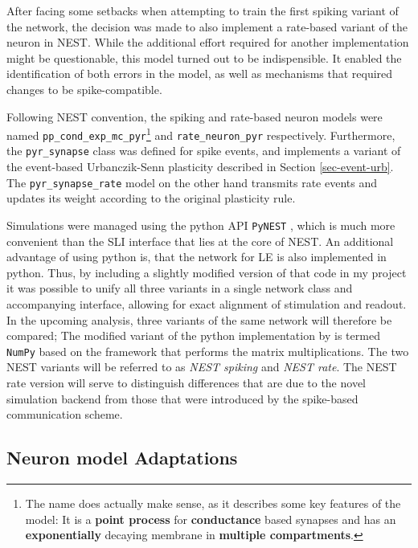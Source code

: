 After facing some setbacks when attempting to train the first spiking variant of the network, the decision was made to
also implement a rate-based variant of the neuron in NEST.  While the additional effort required for another
implementation might be questionable, this model turned out to be indispensible. It enabled the identification of both
errors in the model, as well as mechanisms that required changes to be spike-compatible. 

Following NEST convention, the spiking and rate-based neuron models were named
\texttt{pp\_cond\_exp\_mc\_pyr}\footnote{The name does actually make sense, as it describes some key features of the
model: It is a \textbf{point process} for \textbf{conductance} based synapses and has an \textbf{exponentially} decaying
membrane in \textbf{multiple compartments}.} and \texttt{rate\_neuron\_pyr} respectively. Furthermore, the
\texttt{pyr\_synapse} class was defined for spike events, and implements a variant of the event-based Urbanczik-Senn
plasticity described in Section \ref{sec-event-urb}. The \texttt{pyr\_synapse\_rate} model on the other hand transmits
rate events and updates its weight according to the original plasticity rule.

Simulations were managed using the python API \texttt{PyNEST} \citep{Eppler2009}, which is much more convenient than the
SLI interface that lies at the core of NEST. An additional advantage of using python is, that the network for LE is also
implemented in python. Thus, by including a slightly modified version of that code in my project it was possible to
unify all three variants in a single network class and accompanying interface, allowing for exact alignment of
stimulation and readout. In the upcoming analysis, three variants of the same network will therefore be compared; The
modified variant of the python implementation by \cite{Haider2021} is termed \texttt{NumPy} based on the framework that
performs the matrix multiplications. The two NEST variants will be referred to as \textit{NEST spiking} and \textit{NEST
rate}. The NEST rate version will serve to distinguish differences that are due to the novel simulation backend from
those that were introduced by the spike-based communication scheme.

\subsection{Neuron model Adaptations}

